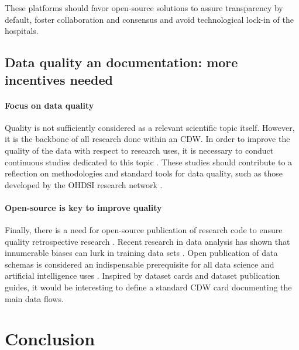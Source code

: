 \documentclass[french,12pt,twoside,a4paper]{book}
\begin{document}
These platforms should favor open-source solutions to assure transparency by
default, foster collaboration and consensus and avoid technological lock-in of
the hospitals.


\subsection{Data quality an documentation: more incentives needed}%
\label{subsec:cdw:recommendations:quality}%

\paragraph{Focus on data quality} Quality is not sufficiently considered as a relevant scientific topic itself.
However, it is the backbone of all research done within an CDW. In order to
improve the quality of the data with respect to research uses, it is necessary
to conduct continuous studies dedicated to this topic
\citep{zhang_best_2022,kohane_what_2021,shang_conceptual_2018,looten_what_2019}.
These studies should contribute to a reflection on methodologies and standard
tools for data quality, such as those developed by the OHDSI research network
\citep{schuemie_book_2021}.

\paragraph{Open-source is key to improve quality} Finally, there is a need for
open-source publication of research code to ensure quality retrospective
research \citep{shang_conceptual_2018,seastedt_global_2022}. Recent research in
data analysis has shown that innumerable biases can lurk in training data sets
\citep{gebru_datasheets_2021,mehrabi_survey_2021}. Open publication of data
schemas is considered an indispensable prerequisite for all data science and
artificial intelligence uses \citep{gebru_datasheets_2021}. Inspired by dataset
cards \citep{gebru_datasheets_2021} and dataset publication guides, it would be
interesting to define a standard CDW card documenting the main data flows.

\section{Conclusion}\label{sec:cdw:conclusion}
\end{document}
